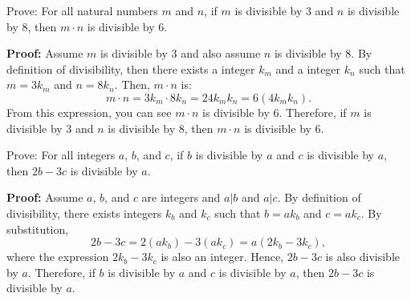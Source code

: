 \documentclass[12pt,addpoints]{exam}
\begin{document}
\begin{questions}
\ifprintanswers
\else
{}

\smallskip
{}

\fi

% 
\question[8] Prove: For all natural numbers $m$ and $n$, if $m$ is divisible by 3 and $n$ is divisible by 8, then $m\cdot n$ is divisible by 6.
    \ifprintanswers
        \vspace{-10pt}
    \fi
\begin{solution} \textbf{Proof:} Assume $m$ is divisible by 3 and also assume $n$ is divisible by 8.  By definition of divisibility, then there exists a integer $k_m$ and a integer $k_n$ such that $m = 3k_m$ and $n=8k_n$.  Then, $m\cdot n$ is:
  \[ m\cdot n = 3k_m \cdot 8k_n = 24k_mk_n = 6(4k_mk_n). \]
From this expression, you can see $m\cdot n$ is divisible by 6.  Therefore, if $m$ is divisible by 3 and $n$ is divisible by 8, then $m \cdot n$ is divisible by 6.
\end{solution}


\question[8] Prove: For all integers $a$, $b$, and $c$, if $b$ is divisible by $a$ and $c$ is divisible by $a$, then $2b - 3c$ is divisible by $a$.
    \ifprintanswers
        \vspace{-10pt}
    \fi
\begin{solution} \textbf{Proof:} Assume $a$, $b$, and $c$ are integers and $a | b$ and $a | c$.  By definition of divisibility, there exists integers $k_b$ and $k_c$ such that $b = ak_b$ and $c = ak_c$.  By substitution,
	\[ 2b - 3c = 2(ak_b) - 3(ak_c) = a(2k_b - 3k_c), \]
where the expression $2k_b - 3k_c$ is also an integer.  Hence, $2b - 3c$ is also divisible by $a$.  Therefore, if $b$ is divisible by $a$ and $c$ is divisible by $a$, then $2b-3c$ is divisible by $a$.
\end{solution}



\end{questions}
\end{document}
